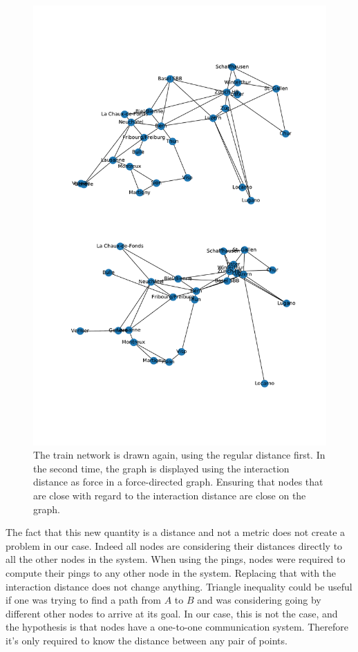 \documentclass[a4paper,11pt,twoside=semi,openright]{report}
\begin{document}
\begin{figure}[!h] 
\centering
\includegraphics[width=350pt]{figures/CFF-NewDistances}
\caption{The train network is drawn again, using the regular distance first. In
 the second time, the graph is displayed using the interaction distance as
 force in a force-directed graph. Ensuring that nodes that are close with
 regard to the interaction distance are close on the graph.}
 \label{fig:CFF-NewDistances}
\end{figure}

The fact that this new quantity is a distance and not a metric does not create
a problem in our case. Indeed all nodes are considering their distances directly
to all the other nodes in the system. When using the pings, nodes were required
to compute their pings to any other node in the system. Replacing that with the
interaction distance does not change anything. Triangle inequality could be
useful if one was trying to find a path from $A$ to $B$ and was considering
going by different other nodes to arrive at its goal. In our case, this is not
the case, and the hypothesis is that nodes have a one-to-one communication system.
Therefore it's only required to know the distance between any pair of points.
\end{document}
